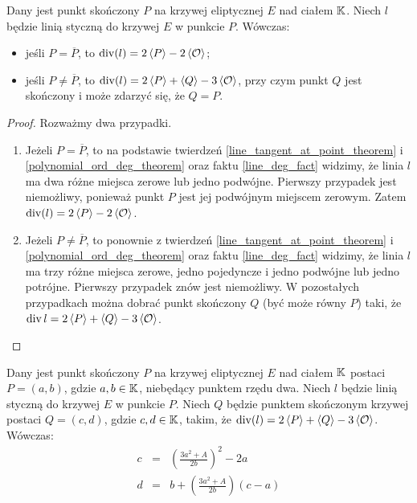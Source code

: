 \begin{theorem}
Dany jest punkt skończony $P$ na krzywej eliptycznej $E$ nad ciałem $\mathbb{K}$.
Niech $l$ będzie linią styczną do krzywej $E$ w punkcie $P$.
Wówczas:
\begin{itemize}
\item jeśli $P = \overline{P}$,
to $\operatorname{div}(l) = 2\left\langle P\right\rangle - 2\left\langle\mathcal{O}\right\rangle$;
\item jeśli $P \neq \overline{P}$,
to $\operatorname{div}(l) = 2\left\langle P\right\rangle + \left\langle Q\right\rangle - 3\left\langle\mathcal{O}\right\rangle$,
przy czym punkt $Q$ jest skończony
i może zdarzyć się, że $Q = P$.
\end{itemize}
\end{theorem}

\begin{proof}
Rozważmy dwa przypadki.
\begin{enumerate}
\item
Jeżeli $P = \overline{P}$,
to na podstawie twierdzeń
\ref{line_tangent_at_point_theorem} i \ref{polynomial_ord_deg_theorem}
oraz faktu \ref{line_deg_fact} widzimy,
że linia $l$ ma dwa różne miejsca zerowe lub jedno podwójne.
Pierwszy przypadek jest niemożliwy,
ponieważ punkt $P$ jest jej podwójnym miejscem zerowym.
Zatem $\operatorname{div}(l) = 2\left\langle P\right\rangle - 2\left\langle\mathcal{O}\right\rangle$.
\item
Jeżeli $P \neq \overline{P}$,
to ponownie z twierdzeń
\ref{line_tangent_at_point_theorem} i \ref{polynomial_ord_deg_theorem}
oraz faktu \ref{line_deg_fact} widzimy,
że linia $l$ ma trzy różne miejsca zerowe, jedno pojedyncze i jedno podwójne
lub jedno potrójne.
Pierwszy przypadek znów jest niemożliwy.
W pozostałych przypadkach można dobrać punkt skończony $Q$
(być może równy $P$) taki,
że $\operatorname{div}{l} = 2\left\langle P\right\rangle + \left\langle Q\right\rangle - 3\left\langle\mathcal{O}\right\rangle$.
\end{enumerate}
\end{proof}

\begin{theorem}
Dany jest punkt skończony $P$ na krzywej eliptycznej $E$ nad ciałem $\mathbb{K}$
postaci $P = (a, b)$, gdzie $a, b \in \mathbb{K}$,
niebędący punktem rzędu dwa.
Niech $l$ będzie linią styczną do krzywej $E$ w punkcie $P$.
Niech $Q$ będzie punktem skończonym krzywej
postaci $Q = (c, d)$, gdzie $c, d \in \mathbb{K}$, takim,
że $\operatorname{div}(l) = 2\left\langle P\right\rangle + \left\langle Q\right\rangle - 3\left\langle\mathcal{O}\right\rangle$.
Wówczas:
\begin{eqnarray}
\label{tangent_line_third_point_x_eqn}
c & = & \left(\frac{3a^2 + A}{2b}\right)^2 - 2a \\
\label{tangent_line_third_point_y_eqn}
d & = & b + \left(\frac{3a^2 + A}{2b}\right)(c - a)
\end{eqnarray}
\end{theorem}

